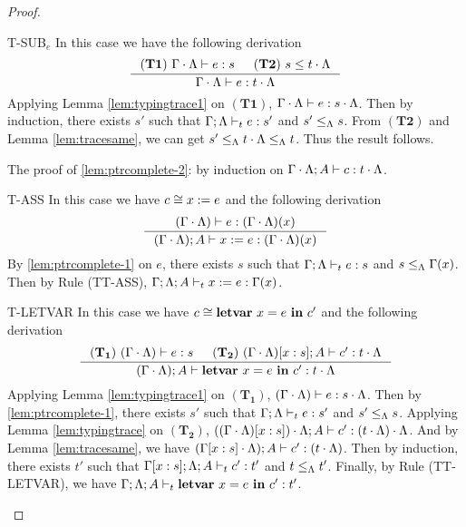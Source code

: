 {{{\begin{proof}
\begin{ProofEnumDesc}
\item[T-SUB$_e$] In this case we have the following derivation
\begin{equation*}
\inference
{(\mathbf{T1})~\Gamma\cdot\trace \vdash e : s & (\mathbf{T2})~s \leq t\cdot\trace}
{\Gamma\cdot\trace \vdash e : t\cdot\trace}
\end{equation*}
Applying Lemma \ref{lem:typingtrace1} on $(\mathbf{T1})$, $\Gamma\cdot\Lambda \vdash e : s\cdot \Lambda$.
Then by induction, there exists $s'$ such that $\Gamma;\Lambda \vdash_{t} e : s'$ and $s' \leq_{\Lambda} s$.
From $(\mathbf{T2})$ and Lemma \ref{lem:tracesame}, we can get $s'\leq_{\Lambda} t\cdot\Lambda \leq_{\Lambda} t $. Thus the result follows.
\end{ProofEnumDesc}
The proof of \ref{lem:ptrcomplete-2}: by induction on $\Gamma\cdot\Lambda; A \vdash c : t\cdot \Lambda $. %
\begin{ProofEnumDesc}
\item[T-ASS] In this case we have $c \cong {x}:={e}$ and the following derivation
\begin{equation*}
\inference
{(\Gamma\cdot\trace) \vdash e : (\Gamma\cdot\trace)(x)}
{(\Gamma\cdot\trace);A \vdash \lcASS{x}{e} : (\Gamma\cdot\trace)(x)}
\end{equation*}
By \ref{lem:ptrcomplete-1} on $e$,  there exists $s$ such that
$\Gamma; \Lambda \vdash_{t} e : s$ and $s \leq_{\Lambda} \Gamma(x)$.
Then by Rule {(TT-ASS)},  $\Gamma;\Lambda; A \vdash_{t} {x}:={e} :\Gamma(x)$.

\item[T-LETVAR] %
In this case we have $c \cong {\textbf{letvar}~ {x} = {e} ~\textbf{in}~ {c'}}$ and the following derivation
\begin{equation*}
\inference
{(\mathbf{T_1}) ~(\Gamma\cdot\trace) \vdash e : s &
(\mathbf{T_2}) ~(\Gamma\cdot\trace)[x:s]; A \vdash c' : t\cdot\trace }
{(\Gamma\cdot\trace); A\vdash \lcLETVAR{x}{e}{c'} :  t\cdot\trace}
\end{equation*}
Applying Lemma \ref{lem:typingtrace1} on $(\mathbf{T_1})$, $(\Gamma\cdot\Lambda) \vdash e : s\cdot\Lambda$.
Then by \ref{lem:ptrcomplete-1},  there exists $s'$ such that $\Gamma;\Lambda \vdash_{t} e : s'$ and $s' \leq_{\Lambda} s$.
Applying Lemma \ref{lem:typingtrace} on $(\mathbf{T_2})$, $((\Gamma\cdot\Lambda)[x:s])\cdot\Lambda; A \vdash c' : (t\cdot\Lambda)\cdot\Lambda$.
And by Lemma \ref{lem:tracesame}, we have $(\Gamma[x:s]\cdot\Lambda); A \vdash c' : (t\cdot\Lambda)$.
Then by induction, there exists $t'$ such that $\Gamma[x:s]; \Lambda; A \vdash_{t} c' : t' $ and $t \leq_{\Lambda} t'$.
Finally, by Rule {(TT-LETVAR)}, we have $\Gamma; \Lambda; A \vdash_{t} {\textbf{letvar}~ {x} = {e} ~\textbf{in}~ {c'}} : t' $.


\end{ProofEnumDesc}
\end{proof}}}}
